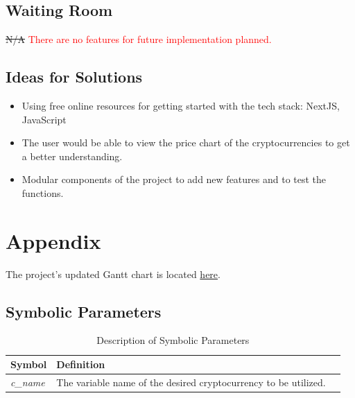 \documentclass[12pt, titlepage]{article}
\begin{document}
\subsection{Waiting Room}
\sout{N/A} \textcolor{red}{There are no features for future implementation planned.}

\subsection{Ideas for Solutions}
\begin{itemize}
    \item Using free online resources for getting started with the tech stack: NextJS, JavaScript
    \item The user would be able to view the price chart of the cryptocurrencies to get a better understanding. 
    \item Modular components of the project to add new features and to test the functions. 
\end{itemize}

\newpage

\section{Appendix}

The project's updated Gantt chart is located \href{https://gitlab.cas.mcmaster.ca/webapp/webapp_l02_grp15/-/tree/main/ProjectSchedule}{here}.

\subsection{Symbolic Parameters}

\begin{table}[!h]
    \begin{tabular}{lll} \toprule
        \textbf{Symbol} & \textbf{Definition}\\ \midrule
        \textit{c\_name} & The variable name of the desired cryptocurrency to be utilized. \\ 
        \bottomrule
    \end{tabular}
    \caption{Description of Symbolic Parameters}
    \label{tab:my_label}
\end{table}


\nocite{*}

\end{document}
